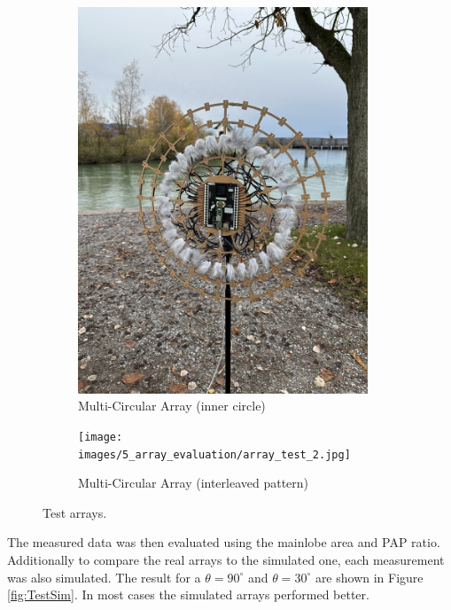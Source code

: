 \begin{figure}[h]
	\centering
	\begin{subfigure}[b]{0.49\textwidth}
		\centering
		\includegraphics[width=0.95\textwidth]{images/5_array_evaluation/array_test_1.jpg}
		\caption{Multi-Circular Array (inner circle)}
		\label{fig:array_test_1}
	\end{subfigure}
	\begin{subfigure}[b]{0.49\textwidth}
		\centering
		\texttt{[image: images/5\_array\_evaluation/array\_test\_2.jpg]}
		\caption{Multi-Circular Array (interleaved  pattern)}
		\label{fig:array_test_2}
	\end{subfigure}
	\caption{Test arrays.}
	\label{fig:testSetup}
\end{figure}
The measured data was then evaluated using the mainlobe area and PAP ratio. 
Additionally to compare the real arrays to the simulated one, each measurement
was also simulated.
The result for a $\theta = 90^\circ$ and $\theta = 30^\circ$ are shown in 
Figure \ref*{fig:TestSim}.
In most cases the simulated arrays performed better.
